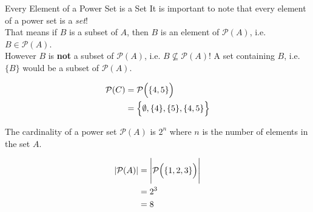 \documentclass[../notes.tex]{subfiles}
\begin{document}
        \begin{notebox}{Every Element of a Power Set is a Set}
          It is important to note that every element of a power set is a \textit{set}!\\ That means if $B$ is a subset of $A$, then $B$ is an element of $\mathcal{P}(A)$, i.e. $B \in \mathcal{P}(A)$.\\
          However $B$ is \textbf{not} a subset of $\mathcal{P}(A)$, i.e. $B \nsubseteq \mathcal{P}(A)$! A set containing $B$, i.e. $\{B\}$ would be a subset of $\mathcal{P}(A)$.
        \end{notebox}
      \begin{examplebox}
        \begin{align*}
          \mathcal{P}(C) &= \mathcal{P}\Bigl(\{4, 5\}\Bigr)\\
          &= \Bigl\{\emptyset, \{4\}, \{5\}, \{4, 5\}\Bigr\}
        \end{align*}
      \end{examplebox}
      The cardinality of a power set $\mathcal{P}(A)$ is $2^{n}$ where $n$ is the number of elements in the set $A$.
      \begin{examplebox}
        \begin{align*}
          \left\lvert \mathcal{P}(A)\right\rvert &= \Biggl|\mathcal{P}\Bigl(\{1, 2, 3\}\Bigr)\Biggr|\\
          &= 2^{3}\\
          &= 8
        \end{align*}
      \end{examplebox}
\end{document}
